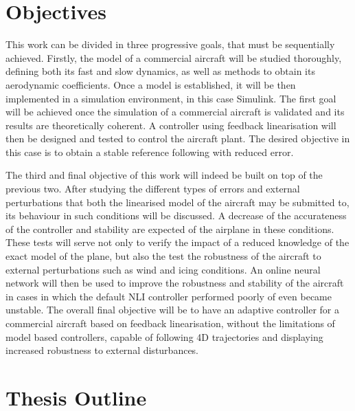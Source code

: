 \section{Objectives}
\label{section:objectives}

This work can be divided in three progressive goals, that must be sequentially achieved. Firstly, the model of a commercial aircraft will be studied thoroughly, defining both its fast and slow dynamics, as well as methods to obtain its aerodynamic coefficients. Once a model is established, it will be then implemented in a simulation environment, in this case Simulink. The first goal will be achieved once the simulation of a commercial aircraft is validated and its results are theoretically coherent. A controller using feedback linearisation will then be designed and tested to control the aircraft plant. The desired objective in this case is to obtain a stable reference following with reduced error.

The third and final objective of this work will indeed be built on top of the previous two. After studying the different types of errors and external perturbations that both the linearised model of the aircraft may be submitted to, its behaviour in such conditions will be discussed. A decrease of the accurateness of the controller and stability are expected of the airplane in these conditions.
These tests will serve not only to verify the impact of a reduced knowledge of the exact model of the plane, but also the test the robustness of the aircraft to external perturbations such as wind and icing conditions. An online neural network will then be used to improve the robustness and stability of the aircraft in cases in which the default NLI controller performed poorly of even became unstable. The overall final objective will be to have an adaptive controller for a commercial aircraft based on feedback linearisation, without the limitations of model based controllers, capable of following 4D trajectories and displaying increased robustness to external disturbances. 

\section{Thesis Outline}
\label{section:outline}

